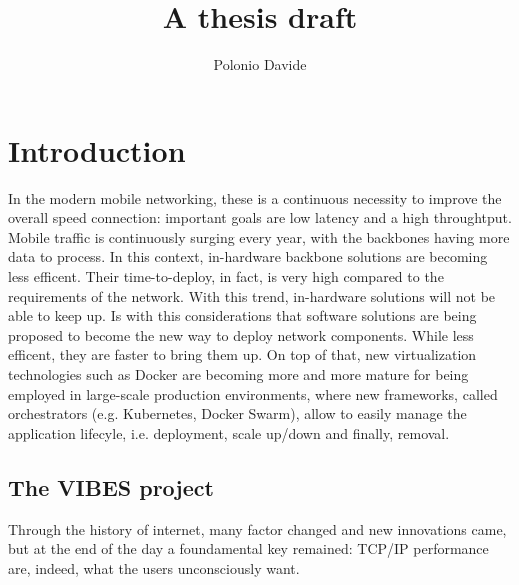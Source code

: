 \documentclass[10pt]{book}
\author{Polonio Davide}
\title{A thesis draft}
\begin{document}
 \maketitle
 

 
 \chapter{Introduction}
 
 In the modern mobile networking, these is a continuous necessity to 
improve the overall speed connection: important goals are low latency and a 
high throughtput. Mobile traffic is continuously surging every year, with 
the backbones having more data to process. In this context, in-hardware 
backbone solutions are becoming less efficent. Their time-to-deploy, in fact, is 
very high compared to the requirements of the network. With this trend, 
in-hardware solutions will not be able to keep up. Is with this considerations 
that software solutions are being proposed to become the new way to deploy 
network components. While less efficent, they are faster to bring them up. On 
top of that, new virtualization technologies such as Docker are becoming more 
and more mature for being employed in large-scale production environments,
where new frameworks, called orchestrators (e.g. Kubernetes, Docker Swarm),
allow to easily manage the application lifecyle, i.e. deployment, scale up/down
and finally, removal.
 
 \section{The VIBES project}
 
 Through the history of internet, many factor changed and new innovations came,
but at the end of the day a foundamental key remained: TCP/IP performance are, 
indeed, what the users unconsciously want.
\end{document}
